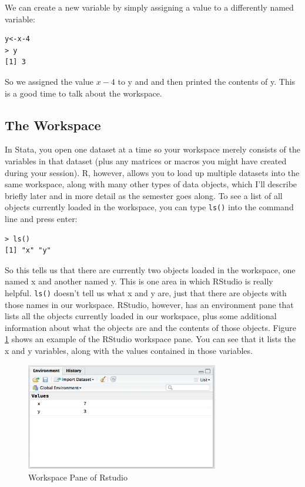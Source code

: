\documentclass[12pt, oneside]{amsart}   	%
\begin{document}
We can create a new variable by simply assigning a value to a differently named variable:

\begin{lstlisting}
y<-x-4
> y
[1] 3
\end{lstlisting}

So we assigned the value $x-4$ to y and and then printed the contents of y. This is a good time to talk about the workspace.

\subsection{The Workspace}

In Stata, you open one dataset at a time so your workspace merely consists of the variables in that dataset (plus any matrices or macros you might have created during your session). R, however, allows you to load up multiple datasets into the same workspace, along with many other types of data objects, which I'll describe briefly later and in more detail as the semester goes along. To see a list of all objects currently loaded in the workspace, you can type \texttt{ls()} into the command line and press enter:

\begin{lstlisting}
> ls()
[1] "x" "y"
\end{lstlisting}

So this tells us that there are currently two objects loaded in the workspace, one named x and another named y. This is one area in which RStudio is really helpful. \texttt{ls()} doesn't tell us what x and y are, just that there are objects with those names in our workspace. RStudio, however, has an environment pane that lists all the objects currently loaded in our workspace, plus some additional information about what the objects are and the contents of those objects. Figure \ref{fig:workspace} shows an example of the RStudio workspace pane. You can see that it lists the x and y variables, along with the values contained in those variables.

\begin{figure}[t]
\caption{Workspace Pane of Rstudio}
\label{fig:workspace}
\centering
\includegraphics[width=0.75\textwidth]{workspace}
\end{figure}
\end{document}
